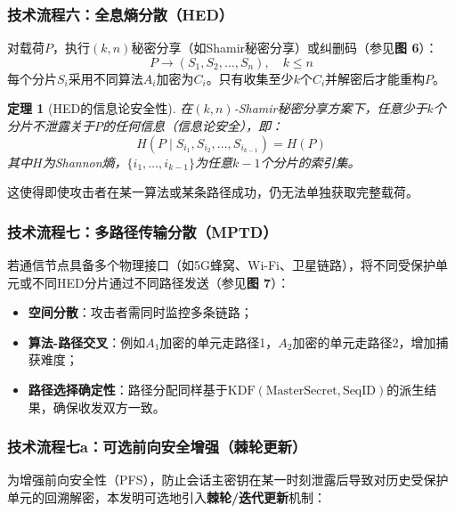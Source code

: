 ﻿\documentclass[12pt,a4paper]{article}
\newtheorem{theorem}{定理}
\begin{document}
\subsubsection{技术流程六：全息熵分散（HED）}

对载荷$P$，执行$(k,n)$秘密分享（如Shamir秘密分享）或纠删码（参见\textbf{图 6}）：
\[
P \to (S_1, S_2, \ldots, S_n), \quad k \leq n
\]
每个分片$S_i$采用不同算法$A_i$加密为$C_i$。只有收集至少$k$个$C_i$并解密后才能重构$P$。

\begin{theorem}[HED的信息论安全性]
在$(k,n)$-Shamir秘密分享方案下，任意少于$k$个分片不泄露关于$P$的任何信息（信息论安全），即：
\[
H(P \mid S_{i_1}, S_{i_2}, \ldots, S_{i_{k-1}}) = H(P)
\]
其中$H$为Shannon熵，$\{i_1, \ldots, i_{k-1}\}$为任意$k-1$个分片的索引集。
\end{theorem}

这使得即使攻击者在某一算法或某条路径成功，仍无法单独获取完整载荷。

\subsubsection{技术流程七：多路径传输分散（MPTD）}

若通信节点具备多个物理接口（如5G蜂窝、Wi-Fi、卫星链路），将不同受保护单元或不同HED分片通过不同路径发送（参见\textbf{图 7}）：

\begin{itemize}
    \item \textbf{空间分散}：攻击者需同时监控多条链路；
    \item \textbf{算法-路径交叉}：例如$A_1$加密的单元走路径1，$A_2$加密的单元走路径2，增加捕获难度；
    \item \textbf{路径选择确定性}：路径分配同样基于$\text{KDF}(\text{MasterSecret}, \text{SeqID})$的派生结果，确保收发双方一致。
\end{itemize}

\subsubsection{技术流程七a：可选前向安全增强（棘轮更新）}

为增强前向安全性（PFS），防止会话主密钥在某一时刻泄露后导致对历史受保护单元的回溯解密，本发明可选地引入\textbf{棘轮/迭代更新}机制：
\end{document}
